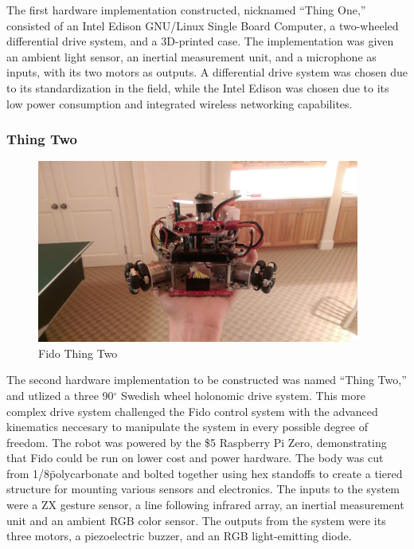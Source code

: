 The first hardware implementation constructed, nicknamed ``Thing One,'' consisted of an Intel Edison GNU/Linux Single Board Computer, a two-wheeled differential drive system, and a 3D-printed case.
The implementation was given an ambient light sensor, an inertial measurement unit, and a microphone as inputs, with its two motors as outputs.
A differential drive system was chosen due to its standardization in the field, while the Intel Edison was chosen due to its low power consumption and integrated wireless networking capabilites.

\subsubsection{Thing Two}
\begin{figure}
	\centering
	\includegraphics[height=6cm]{Figures/ThingTwo.jpg}
	\caption{Fido Thing Two}
\end{figure}

The second hardware implementation to be constructed was named ``Thing Two,'' and utlized a three 90$^{\circ}$ Swedish wheel holonomic drive system.
This more complex drive system challenged the Fido control system with the advanced kinematics neccesary to manipulate the system in every possible degree of freedom.
The robot was powered by the \$5 Raspberry Pi Zero, demonstrating that Fido could be run on lower cost and power hardware.
The body was cut from 1/8\" polycarbonate and bolted together using hex standoffs to create a tiered structure for mounting various sensors and electronics.
The inputs to the system were a ZX gesture sensor, a line following infrared array, an inertial measurement unit and an ambient RGB color sensor.
The outputs from the system were its three motors, a piezoelectric buzzer, and an RGB light-emitting diode.

